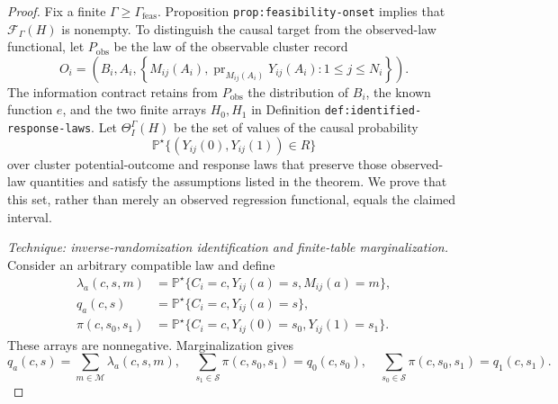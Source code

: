 \documentclass{article}
\begin{document}
\begin{proof}
Fix a finite \(\Gamma\geq\Gamma_{\mathrm{feas}}\).  Proposition \texttt{prop:feasibility-onset} implies that \(\mathcal F_{\Gamma}(H)\) is nonempty.  To distinguish the causal target from the observed-law functional, let \(P_{\mathrm{obs}}\) be the law of the observable cluster record
\[
O_i=\left(B_i,A_i,
  \left\{M_{ij}(A_i),
  \operatorname{pr}_{M_{ij}(A_i)}Y_{ij}(A_i):1\leq j\leq N_i\right\}
  \right).
\]
The information contract retains from \(P_{\mathrm{obs}}\) the distribution of \(B_i\), the known function \(e\), and the two finite arrays \(H_0,H_1\) in Definition \texttt{def:identified-response-laws}.  Let \(\Theta_I^{\Gamma}(H)\) be the set of values of the causal probability
\[
\mathbb P^{\star}\{(Y_{ij}(0),Y_{ij}(1))\in R\}
\]
over cluster potential-outcome and response laws that preserve those observed-law quantities and satisfy the assumptions listed in the theorem.  We prove that this set, rather than merely an observed regression functional, equals the claimed interval.

\emph{Technique: inverse-randomization identification and finite-table marginalization.}
Consider an arbitrary compatible law and define
\[
\begin{aligned}
\lambda_a(c,s,m)
  &=\mathbb P^{\star}\{C_i=c,Y_{ij}(a)=s,M_{ij}(a)=m\},\\
q_a(c,s)
  &=\mathbb P^{\star}\{C_i=c,Y_{ij}(a)=s\},\\
\pi(c,s_0,s_1)
  &=\mathbb P^{\star}\{C_i=c,Y_{ij}(0)=s_0,Y_{ij}(1)=s_1\}.
\end{aligned}
\]
These arrays are nonnegative.  Marginalization gives
\[
q_a(c,s)=\sum_{m\in\mathcal M}\lambda_a(c,s,m),
\quad
\sum_{s_1\in\mathcal S}\pi(c,s_0,s_1)=q_0(c,s_0),
\quad
\sum_{s_0\in\mathcal S}\pi(c,s_0,s_1)=q_1(c,s_1).
\]


\end{proof}
\end{document}
